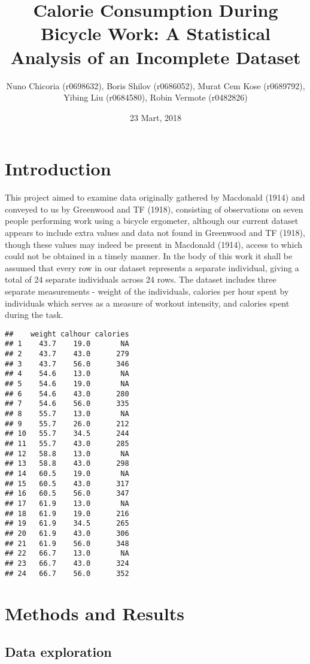\documentclass[]{article}
\title{Calorie Consumption During Bicycle Work: A Statistical Analysis of an
Incomplete Dataset}
\author{Nuno Chicoria (r0698632), Boris Shilov (r0686052), Murat Cem Kose
(r0689792), Yibing Liu (r0684580), Robin Vermote (r0482826)}
\date{23 Mart, 2018}
\theoremstyle{definition}
\theoremstyle{definition}
\theoremstyle{definition}
\theoremstyle{remark}
\begin{document}
\maketitle

{
\setcounter{tocdepth}{2}
\tableofcontents
}
\section{Introduction}\label{introduction}

This project aimed to examine data originally gathered by Macdonald
(1914) and conveyed to us by Greenwood and TF (1918), consisting of
observations on seven people performing work using a bicycle ergometer,
although our current dataset appears to include extra values and data
not found in Greenwood and TF (1918), though these values may indeed be
present in Macdonald (1914), access to which could not be obtained in a
timely manner. In the body of this work it shall be assumed that every
row in our dataset represents a separate individual, giving a total of
24 separate individuals across 24 rows. The dataset includes three
separate measurements - weight of the individuals, calories per hour
spent by individuals which serves as a measure of workout intensity, and
calories spent during the task.

\begin{verbatim}
##    weight calhour calories
## 1    43.7    19.0       NA
## 2    43.7    43.0      279
## 3    43.7    56.0      346
## 4    54.6    13.0       NA
## 5    54.6    19.0       NA
## 6    54.6    43.0      280
## 7    54.6    56.0      335
## 8    55.7    13.0       NA
## 9    55.7    26.0      212
## 10   55.7    34.5      244
## 11   55.7    43.0      285
## 12   58.8    13.0       NA
## 13   58.8    43.0      298
## 14   60.5    19.0       NA
## 15   60.5    43.0      317
## 16   60.5    56.0      347
## 17   61.9    13.0       NA
## 18   61.9    19.0      216
## 19   61.9    34.5      265
## 20   61.9    43.0      306
## 21   61.9    56.0      348
## 22   66.7    13.0       NA
## 23   66.7    43.0      324
## 24   66.7    56.0      352
\end{verbatim}

\section{Methods and Results}\label{methods-and-results}

\subsection{Data exploration}\label{data-exploration}
\end{document}
